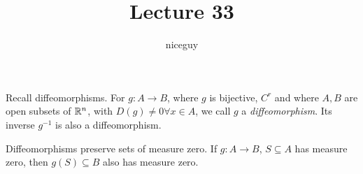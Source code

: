 \documentclass[12pt]{article}
\title{Lecture 33}
\author{niceguy}
\begin{document}
\maketitle

Recall diffeomorphisms. For $g:A\rightarrow B$, where $g$ is bijective, $C^r$ and where $A,B$ are open subsets of $\mathbb{R}^n$, with $D(g) \neq 0 \forall x \in A$, we call $g$ a \textit{diffeomorphism}. Its inverse $g^{-1}$ is also a diffeomorphism.

\begin{lem}
    Diffeomorphisms preserve sets of measure zero. If $g:A \rightarrow B$, $S \subseteq A$ has measure zero, then $g(S) \subseteq B$ also has measure zero.
\end{lem}
\end{document}
